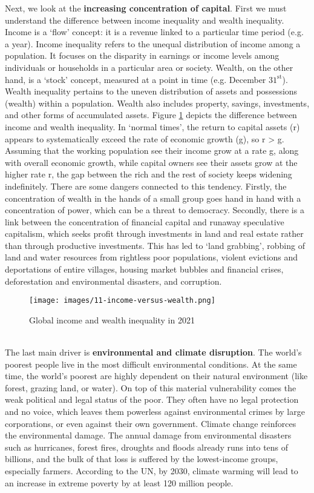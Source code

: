 \documentclass[../summary.tex]{subfiles}
\begin{document}
Next, we look at the \textbf{increasing concentration of capital}. First we must understand the difference between income inequality and wealth inequality. Income is a `flow' concept: it is a revenue linked to a particular time period (e.g. a year). Income inequality refers to the unequal distribution of income among a population. It focuses on the disparity in earnings or income levels among individuals or households in a particular area or society. Wealth, on the other hand, is a `stock' concept, measured at a point in time (e.g. December $\mathrm{31^{st}}$). Wealth inequality pertains to the uneven distribution of assets and possessions (wealth) within a population. Wealth also includes property, savings, investments, and other forms of accumulated assets. Figure \ref{fig:income-versus-wealth} depicts the difference between income and wealth inequality. In `normal times', the return to capital assets (r) appears to systematically exceed the rate of economic growth (g), so r > g. Assuming that the working population see their income grow at a rate g, along with overall economic growth, while capital owners see their assets grow at the higher rate r, the gap between the rich and the rest of society keeps widening indefinitely. There are some dangers connected to this tendency. Firstly, the concentration of wealth in the hands of a small group goes hand in hand with a concentration of power, which can be a threat to democracy. Secondly, there is a link between the concentration of financial capital and runaway speculative capitalism, which seeks profit through investments in land and real estate rather than through productive investments. This has led to `land grabbing', robbing of land and water resources from rightless poor populations, violent evictions and deportations of entire villages, housing market bubbles and financial crises, deforestation and environmental disasters, and corruption.
\\
\begin{figure}[htbp]
	\centering
	\texttt{[image: images/11-income-versus-wealth.png]}
	\caption{Global income and wealth inequality in 2021}
	\label{fig:income-versus-wealth}
\end{figure}
\ \\
The last main driver is \textbf{environmental and climate disruption}. The world's poorest people live in the most difficult environmental conditions. At the same time, the world's poorest are highly dependent on their natural environment (like forest, grazing land, or water). On top of this material vulnerability comes the weak political and legal status of the poor. They often have no legal protection and no voice, which leaves them powerless against environmental crimes by large corporations, or even against their own government. Climate change reinforces the environmental damage. The annual damage from environmental disasters such as hurricanes, forest fires, droughts and floods already runs into tens of billions, and the bulk of that loss is suffered by the lowest-income groups, especially farmers. According to the UN, by 2030, climate warming will lead to an increase in extreme poverty by at least 120 million people.
\\\\
\end{document}
